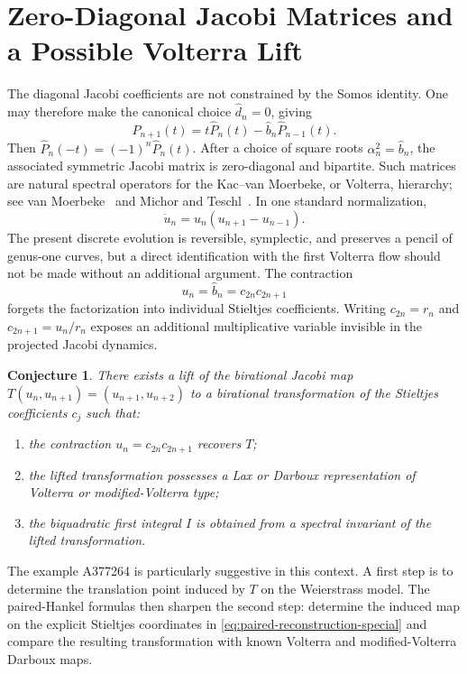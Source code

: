 \documentclass[11pt]{article}
\newtheorem{conjecture}[theorem]{Conjecture}
\theoremstyle{remark}
\begin{document}
\section{Zero-Diagonal Jacobi Matrices and a Possible Volterra Lift}
The diagonal Jacobi coefficients are not constrained by the Somos identity. One may therefore make the canonical choice $\widehat d_n=0$, giving
\begin{equation}
\widehat P_{n+1}(t)=t\widehat P_n(t)-\widehat b_n\widehat P_{n-1}(t).
\end{equation}
Then $\widehat P_n(-t)=(-1)^n\widehat P_n(t)$. After a choice of square roots $\alpha_n^2=\widehat b_n$, the associated symmetric Jacobi matrix is zero-diagonal and bipartite. Such matrices are natural spectral operators for the Kac--van Moerbeke, or Volterra, hierarchy; see van Moerbeke~\cite{VanMoerbeke1976} and Michor and Teschl~\cite{MichorTeschl2009}. In one standard normalization,
\begin{equation}
\dot u_n=u_n(u_{n+1}-u_{n-1}).
\end{equation}
The present discrete evolution is reversible, symplectic, and preserves a pencil of genus-one curves, but a direct identification with the first Volterra flow should not be made without an additional argument. The contraction
\begin{equation}
u_n=\widehat b_n=c_{2n}c_{2n+1}
\end{equation}
forgets the factorization into individual Stieltjes coefficients. Writing $c_{2n}=r_n$ and $c_{2n+1}=u_n/r_n$ exposes an additional multiplicative variable invisible in the projected Jacobi dynamics.
\begin{conjecture}
There exists a lift of the birational Jacobi map $T(u_n,u_{n+1})=(u_{n+1},u_{n+2})$ to a birational transformation of the Stieltjes coefficients $c_j$ such that:
\begin{enumerate}
\item the contraction $u_n=c_{2n}c_{2n+1}$ recovers $T$;
\item the lifted transformation possesses a Lax or Darboux representation of Volterra or modified-Volterra type;
\item the biquadratic first integral $I$ is obtained from a spectral invariant of the lifted transformation.
\end{enumerate}
\end{conjecture}
The example A377264 is particularly suggestive in this context. A first step is to determine the translation point induced by $T$ on the Weierstrass model. The paired-Hankel formulas then sharpen the second step: determine the induced map on the explicit Stieltjes coordinates in \eqref{eq:paired-reconstruction-special} and compare the resulting transformation with known Volterra and modified-Volterra Darboux maps.
\end{document}
